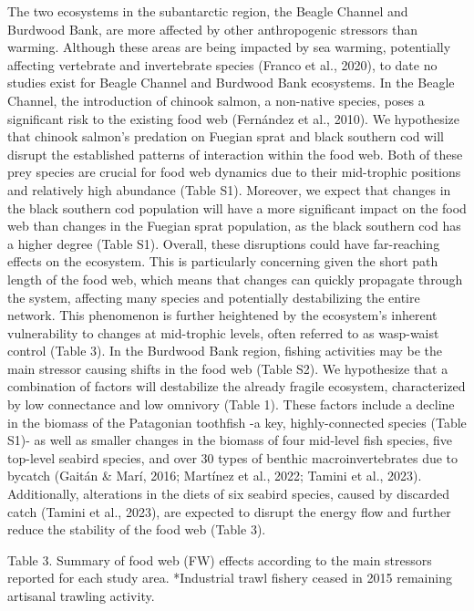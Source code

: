 \documentclass[
]{article}
\begin{document}
The two ecosystems in the subantarctic region, the Beagle Channel and
Burdwood Bank, are more affected by other anthropogenic stressors than
warming. Although these areas are being impacted by sea warming,
potentially affecting vertebrate and invertebrate species (Franco et
al., 2020), to date no studies exist for Beagle Channel and Burdwood
Bank ecosystems. In the Beagle Channel, the introduction of chinook
salmon, a non-native species, poses a significant risk to the existing
food web (Fernández et al., 2010). We hypothesize that chinook salmon's
predation on Fuegian sprat and black southern cod will disrupt the
established patterns of interaction within the food web. Both of these
prey species are crucial for food web dynamics due to their mid-trophic
positions and relatively high abundance (Table S1). Moreover, we expect
that changes in the black southern cod population will have a more
significant impact on the food web than changes in the Fuegian sprat
population, as the black southern cod has a higher degree (Table S1).
Overall, these disruptions could have far-reaching effects on the
ecosystem. This is particularly concerning given the short path length
of the food web, which means that changes can quickly propagate through
the system, affecting many species and potentially destabilizing the
entire network. This phenomenon is further heightened by the ecosystem's
inherent vulnerability to changes at mid-trophic levels, often referred
to as wasp-waist control (Table 3). In the Burdwood Bank region, fishing
activities may be the main stressor causing shifts in the food web
(Table S2). We hypothesize that a combination of factors will
destabilize the already fragile ecosystem, characterized by low
connectance and low omnivory (Table 1). These factors include a decline
in the biomass of the Patagonian toothfish -a key, highly-connected
species (Table S1)- as well as smaller changes in the biomass of four
mid-level fish species, five top-level seabird species, and over 30
types of benthic macroinvertebrates due to bycatch (Gaitán \& Marí,
2016; Martínez et al., 2022; Tamini et al., 2023). Additionally,
alterations in the diets of six seabird species, caused by discarded
catch (Tamini et al., 2023), are expected to disrupt the energy flow and
further reduce the stability of the food web (Table 3).

\scriptsize

Table 3. Summary of food web (FW) effects according to the main
stressors reported for each study area. *Industrial trawl fishery ceased
in 2015 remaining artisanal trawling activity.
\end{document}
